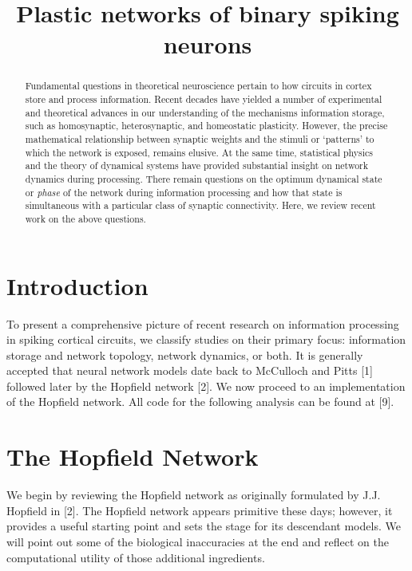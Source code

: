 \documentclass{article} %
\title{Plastic networks of binary spiking neurons}
\begin{document}
\maketitle

\begin{abstract}

Fundamental questions in theoretical neuroscience pertain to how circuits in cortex store and process information. Recent decades have yielded a number of experimental and theoretical advances in our understanding of the mechanisms information storage, such as homosynaptic, heterosynaptic, and homeostatic plasticity. However, the precise mathematical relationship between synaptic weights and the stimuli or `patterns' to which the network is exposed, remains elusive. At the same time, statistical physics and the theory of dynamical systems have provided substantial insight on network dynamics during processing. There remain questions on the optimum dynamical state or \emph{phase} of the network during information processing and how that state is simultaneous with a particular class of synaptic connectivity. Here, we review recent work on the above questions.


\end{abstract}


\section{Introduction}

To present a comprehensive picture of recent research on information processing in spiking cortical circuits, we classify studies on their primary focus: information storage and network topology, network dynamics, or both. It is generally accepted that neural network models date back to McCulloch and Pitts [1] followed later by the Hopfield network [2]. We now proceed to an implementation of the Hopfield network. All code for the following analysis can be found at [9].  

\section{The Hopfield Network}

We begin by reviewing the Hopfield network as originally formulated by J.J. Hopfield in [2]. The Hopfield network appears primitive these days; however, it provides a useful starting point and sets the stage for its descendant models. We will point out some of the biological inaccuracies at the end and reflect on the computational utility of those additional ingredients.
\end{document}
